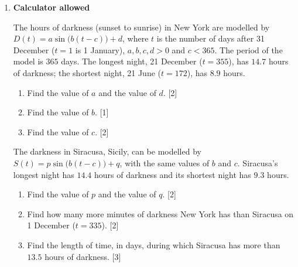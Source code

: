 \documentclass[12pt, twoside]{article}
\begin{document}
\begin{enumerate}[itemsep=0.15cm]
\begin{enumerate}[itemsep=0.1cm]
  \item Find $AC$. \hfill [3]
  \item Find $AD$. \hfill [3]
  \item Find the area of quadrilateral $ABCD$. \hfill [3]
\end{enumerate}


\newpage

\item[4.] [Maximum mark: 12] \hfill \textbf{Calculator allowed}

The hours of darkness (sunset to sunrise) in New York are modelled by
$D(t) = a\sin\bigl(b(t - c)\bigr) + d$, where $t$ is the number of days
after 31 December ($t = 1$ is 1 January), $a, b, c, d > 0$ and $c < 365$.
The period of the model is $365$ days. The longest night, 21 December
($t = 355$), has $14.7$ hours of darkness; the shortest night, 21 June
($t = 172$), has $8.9$ hours.

\begin{enumerate}[itemsep=0.05cm]
  \item Find the value of $a$ and the value of $d$. \hfill [2]
  \item Find the value of $b$. \hfill [1]
  \item Find the value of $c$. \hfill [2]
\end{enumerate}

The darkness in Siracusa, Sicily, can be modelled by
$S(t) = p\sin\bigl(b(t - c)\bigr) + q$, with the same values of $b$ and
$c$. Siracusa's longest night has $14.4$ hours of darkness and its
shortest night has $9.3$ hours.

\begin{enumerate}[itemsep=0.05cm]
  \item[(d)] Find the value of $p$ and the value of $q$. \hfill [2]
  \item[(e)] Find how many more minutes of darkness New York has than
  Siracusa on 1 December ($t = 335$). \hfill [2]
  \item[(f)] Find the length of time, in days, during which Siracusa has
  more than $13.5$ hours of darkness. \hfill [3]
\end{enumerate}


\end{enumerate}
\end{document}
